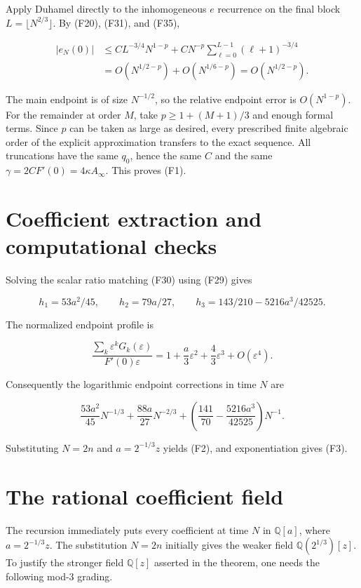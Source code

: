 \documentclass[11pt,letterpaper]{article}
\numberwithin{equation}{section}
\theoremstyle{remark}
\begin{document}
Apply Duhamel directly to the inhomogeneous \(e\) recurrence on the final block \(L=\lfloor N^{2/3}\rfloor\). By (F20), (F31), and (F35),

\[
\begin{aligned}
|e_N(0)|&\le CL^{-3/4}N^{1-p}
+CN^{-p}\sum_{\ell=0}^{L-1}(\ell+1)^{-3/4}\\
&=O(N^{1/2-p})+O(N^{1/6-p})
=O(N^{1/2-p}).
\end{aligned}
\tag{F36}
\]

The main endpoint is of size \(N^{-1/2}\), so the relative endpoint error is \(O(N^{1-p})\). For the remainder at order \(M\), take \(p\ge 1+(M+1)/3\) and enough formal terms. Since \(p\) can be taken as large as desired, every prescribed finite algebraic order of the explicit approximation transfers to the exact sequence. All truncations have the same \(q_0\), hence the same \(C\) and the same \(\gamma =2CF'(0)=4\kappa A_\infty\). This proves (F1).

\section{Coefficient extraction and computational checks}\label{air:rb:coefficient-extraction-and-computational-checks}

Solving the scalar ratio matching (F30) using (F29) gives

\[
h_1=53a^2/45,\qquad h_2=79a/27,\qquad
h_3=143/210-5216a^3/42525.
\]

The normalized endpoint profile is

\[
\frac{\sum_k\varepsilon^kG_k(\varepsilon)}{F'(0)\varepsilon}
=1+\frac a3\varepsilon^2+\frac43\varepsilon^3+O(\varepsilon^4).
\]

Consequently the logarithmic endpoint corrections in time \(N\) are

\[
\frac{53a^2}{45}N^{-1/3}
+\frac{88a}{27}N^{-2/3}
+\left(\frac{141}{70}-\frac{5216a^3}{42525}\right)N^{-1}.
\]

Substituting \(N=2n\) and \(a=2^{-1/3}z\) yields (F2), and exponentiation gives (F3).

\section{The rational coefficient field}\label{air:rb:the-rational-coefficient-field}

The recursion immediately puts every coefficient at time \(N\) in \(\mathbb Q[a]\), where \(a=2^{-1/3}z\). The substitution \(N=2n\) initially gives the weaker field \(\mathbb Q(2^{1/3})[z]\). To justify the stronger field \(\mathbb Q[z]\) asserted in the theorem, one needs the following mod-3 grading.
\end{document}

